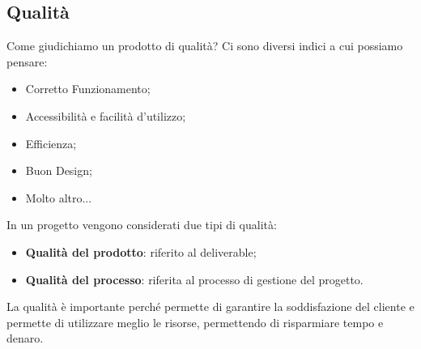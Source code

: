 \subsection{Qualità}
Come giudichiamo un prodotto di qualità? Ci sono diversi indici a cui possiamo pensare:
\begin{itemize}
	\item Corretto Funzionamento;
	\item Accessibilità e facilità d'utilizzo;
	\item Efficienza;
	\item Buon Design;
	\item Molto altro...
\end{itemize}
In un progetto vengono considerati due tipi di qualità:
\begin{itemize}
	\item \textbf{Qualità del prodotto}: riferito al deliverable;
	\item \textbf{Qualità del processo}: riferita al processo di gestione del progetto.
\end{itemize}
La qualità è importante perché permette di garantire la soddisfazione del cliente e permette di utilizzare meglio le risorse, permettendo di risparmiare tempo e denaro.
